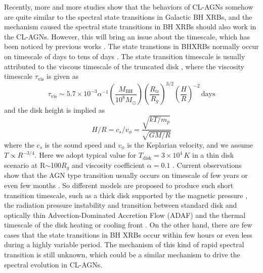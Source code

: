 \documentclass[twocolumn]{aastex63}
\begin{document}
Recently, more and more studies show that the behaviors of CL-AGNs somehow are quite similar to the spectral state transitions in Galactic BH XRBs, and the mechanism caused the spectral state transitions in BH XRBs should also work in the CL-AGNs. However, this will bring an issue about the timescale, which has been noticed by previous works \citep[e.g. ][]{2018NatAs...2..102L,2018ApJ...864...27S,2018MNRAS.480.3898N,2020MNRAS.492.2335L}. The state transtions in BHXRBs normally occur on timescale of days to tens of days \citep{2009ApJ...701.1940Y,2010MNRAS.403...61D}. The state transition timescale is usually
attributed to the viscous timescale of the truncated disk \citep[see reviews in ][]{2007A&ARv..15....1D}, where the viscosity timescale $\tau_\mathrm{vis}$ is given as
\begin{equation}
\tau_\mathrm{vis} \sim 5.7\times 10^{-3} \alpha^{-1}(\frac{M_\mathrm{BH}}{10^8M_{\odot}})(\frac{R_\mathrm{tr}}{R_g})^{3/2} (\frac{H}{R})^{-2} \, \mathrm{days} \end{equation} 
and the disk height is implied as
\begin{equation}
H/R = c_s/v_{\phi}=\frac{\sqrt{kT/m_p}}{\sqrt{GM/R}}
\end{equation} 
where the $c_s$ is the sound speed and $v_{\phi}$ is the Keplarian velocity, and we assume $T\propto R^{-3/4}$. Here we adopt typical value for $T_\mathrm{disk}=3\times10^4\, K$ in a thin disk scenario at R$\sim$100$R_g$ and viscosity coefficient $\alpha=0.1$ \citep[see also][]{2018MNRAS.480.3898N}. Current observations show that the AGN type transition usually occurs on timescale of few years \citep[e.g.][]{2016A&A...593L...8M,2018ApJ...864...27S,2019MNRAS.483L..88P,2020MNRAS.492.2335L} or even few months \citep{2019ApJ...883...94T}. So different models are proposed to produce such short transition timescale, such as a thick disk supported by the magnetic pressure \citep{2019MNRAS.483L..17D}, the radiation pressure instability and  transition between standard disk and optically thin Advection-Dominated
Accretion Flow (ADAF) \citep{2019arXiv190406767S} and the thermal timescale of the disk heating or cooling front \citep{2018ApJ...864...27S}. On the other hand, there are few cases that the state transitions in BH XRBs occur within few hours or even less \citep[e.g.][]{2011A&A...533A...8B,2020A&A...634A..94K} during a highly variable period. The mechanism of this kind of rapid spectral transition is still unknown, which could be a similar mechanism to drive the spectral evolution in CL-AGNs.
\end{document}

